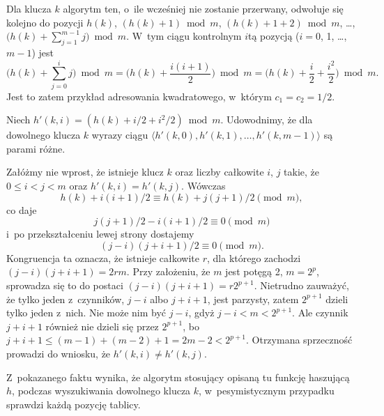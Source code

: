 \bignegskip

\subproblem %
Dla klucza $k$ algorytm ten, o~ile wcześniej nie zostanie przerwany, odwołuje się kolejno do pozycji $h(k)$, $(h(k)+1)\bmod m$, $(h(k)+1+2)\bmod m$, \dots, $\bigl(h(k)+\sum_{j=1}^{m-1}j\bigr)\bmod m$.
W~tym ciągu kontrolnym $i$\nbhyphen tą pozycją ($i=0$, 1, \dots, $m-1$) jest
\[
	\biggl(h(k)+\sum_{j=0}^ij\biggr)\bmod m = \biggl(h(k)+\frac{i(i+1)}{2}\biggr)\bmod m = \biggl(h(k)+\frac{i}{2}+\frac{i^2}{2}\biggr)\bmod m.
\]
Jest to zatem przykład adresowania kwadratowego, w~którym $c_1=c_2=1/2$.

\subproblem %
Niech $h'(k,i)=(h(k)+i/2+i^2\!/2)\bmod m$.
Udowodnimy, że dla dowolnego klucza $k$ wyrazy ciągu $\langle h'(k,0),h'(k,1),\dots,h'(k,m-1)\rangle$ są parami różne.

Załóżmy nie wprost, że istnieje klucz $k$ oraz liczby całkowite $i$, $j$ takie, że $0\le i<j<m$ oraz $h'(k,i)=h'(k,j)$.
Wówczas
\[
	h(k)+i(i+1)/2 \equiv h(k)+j(j+1)/2 \pmod m,
\]
co daje
\[
	j(j+1)/2-i(i+1)/2 \equiv 0 \pmod m
\]
i~po przekształceniu lewej strony dostajemy
\[
	(j-i)(j+i+1)/2 \equiv 0 \pmod m.
\]
Kongruencja ta oznacza, że istnieje całkowite $r$, dla którego zachodzi $(j-i)(j+i+1)=2rm$.
Przy założeniu, że $m$ jest potęgą 2, $m=2^p$, sprowadza się to do postaci $(j-i)(j+i+1)=r2^{p+1}$.
Nietrudno zauważyć, że tylko jeden z~czynników, $j-i$ albo $j+i+1$, jest parzysty, zatem $2^{p+1}$ dzieli tylko jeden z~nich.
Nie może nim być $j-i$, gdyż $j-i<m<2^{p+1}$.
Ale czynnik $j+i+1$ również nie dzieli się przez $2^{p+1}$, bo $j+i+1\le(m-1)+(m-2)+1=2m-2<2^{p+1}$.
Otrzymana sprzeczność prowadzi do wniosku, że $h'(k,i)\ne h'(k,j)$.

Z~pokazanego faktu wynika, że algorytm stosujący opisaną tu funkcję haszującą $h$, podczas wyszukiwania dowolnego klucza $k$, w~pesymistycznym przypadku sprawdzi każdą pozycję tablicy.
